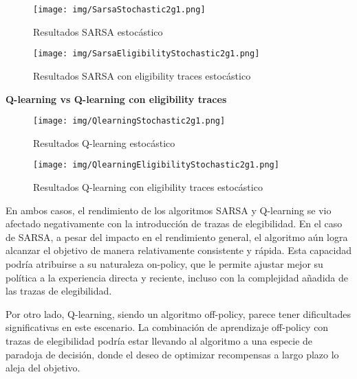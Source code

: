 \documentclass[
	spanish, %
	oneside
]{article}
\begin{document}
\begin{figure}[H]
	\centering
	\texttt{[image: img/SarsaStochastic2g1.png]}
	\caption{Resultados SARSA estocástico}
	\label{fig:map2_sarsa_stochastic2}
\end{figure}

\begin{figure}[H]
	\centering
	\texttt{[image: img/SarsaEligibilityStochastic2g1.png]}
	\caption{Resultados SARSA con eligibility traces estocástico}
	\label{fig:map2_sarsa_eligibility_stochastic}
\end{figure}

\newpage
\indent\textbf{Q-learning vs Q-learning con eligibility traces}

\begin{figure}[H]
	\centering
	\texttt{[image: img/QlearningStochastic2g1.png]}
	\caption{Resultados Q-learning estocástico}
	\label{fig:map2_qlearning_stochastic3}
\end{figure}

\begin{figure}[H]
	\centering
	\texttt{[image: img/QlearningEligibilityStochastic2g1.png]}
	\caption{Resultados Q-learning con eligibility traces estocástico}
	\label{fig:map2_qlearning_eligibility_stochastic}
\end{figure}

\newpage
\noindent En ambos casos, el rendimiento de los algoritmos SARSA y Q-learning se vio afectado negativamente con la introducción de trazas de elegibilidad. En el caso de SARSA, a pesar del impacto en el rendimiento general, el algoritmo aún logra alcanzar el objetivo de manera relativamente consistente y rápida. Esta capacidad podría atribuirse a su naturaleza on-policy, que le permite ajustar mejor su política a la experiencia directa y reciente, incluso con la complejidad añadida de las trazas de elegibilidad.
\vspace*{12pt}

\noindent Por otro lado, Q-learning, siendo un algoritmo off-policy, parece tener dificultades significativas en este escenario. La combinación de aprendizaje off-policy con trazas de elegibilidad podría estar llevando al algoritmo a una especie de paradoja de decisión, donde el deseo de optimizar recompensas a largo plazo lo aleja del objetivo. 



\end{document}
